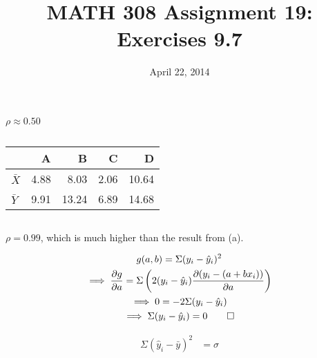 \documentclass[twocolumn]{article}
\title{MATH 308 Assignment 19:\\Exercises 9.7}
\date{April 22, 2014}
\begin{document}
\maketitle

\subsection{}
$\rho\approx0.50$
\subsection{}
\begin{table}[h]\centering
\begin{tabular}{@{}lrrrr@{}}
\toprule
  & A    & B     & C    & D     \\ \midrule
$\bar X$ & 4.88 & 8.03  & 2.06 & 10.64 \\
$\bar Y$ & 9.91 & 13.24 & 6.89 & 14.68 \\ \bottomrule
\end{tabular}
\end{table}
\subsection{}
$\rho=0.99$, which is much higher than the result from (a).

\begin{gather*}
g(a,b)=\Sigma(y_i-\hat y_i)^2\\
\implies \frac{\partial g}{\partial a}
=\Sigma \left(2(y_i-\hat y_i)\frac{\partial (y_i-(a+bx_i))}{\partial a}\right)\\
\implies 0=-2\Sigma (y_i-\hat y_i)\\
\implies \Sigma (y_i-\hat y_i)=0 \qed
\end{gather*}


\begin{align*}
\Sigma (\hat y_i -\bar y)^2
&=\sigma
\end{align*}
\end{document}
